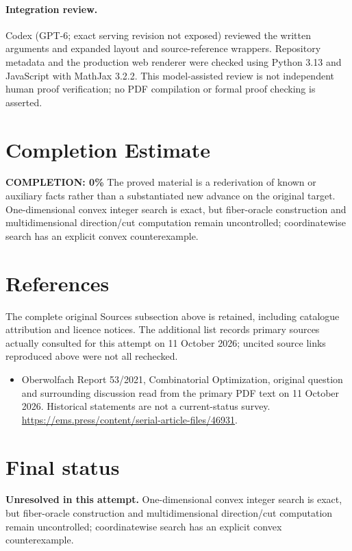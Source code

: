 \documentclass[11pt]{article}
\begin{document}
\paragraph{Integration review.} Codex (GPT-6; exact serving revision not exposed) reviewed the written arguments and expanded layout and source-reference wrappers. Repository metadata and the production web renderer were checked using Python 3.13 and JavaScript with MathJax 3.2.2. This model-assisted review is not independent human proof verification; no PDF compilation or formal proof checking is asserted.

\section{Completion Estimate}
\noindent\textbf{COMPLETION: 0\%}
The proved material is a rederivation of known or auxiliary facts rather than a substantiated new advance on the original target. One-dimensional convex integer search is exact, but fiber-oracle construction and multidimensional direction/cut computation remain uncontrolled; coordinatewise search has an explicit convex counterexample.
\section{References}
The complete original Sources subsection above is retained, including catalogue attribution and licence notices. The additional list records primary sources actually consulted for this attempt on 11 October 2026; uncited source links reproduced above were not all rechecked.
\begin{itemize}
\item Oberwolfach Report 53/2021, Combinatorial Optimization, original question and surrounding discussion read from the primary PDF text on 11 October 2026. Historical statements are not a current-status survey. \url{https://ems.press/content/serial-article-files/46931}.
\end{itemize}
\section{Final status}
\textbf{Unresolved in this attempt.} One-dimensional convex integer search is exact, but fiber-oracle construction and multidimensional direction/cut computation remain uncontrolled; coordinatewise search has an explicit convex counterexample.
\end{document}
